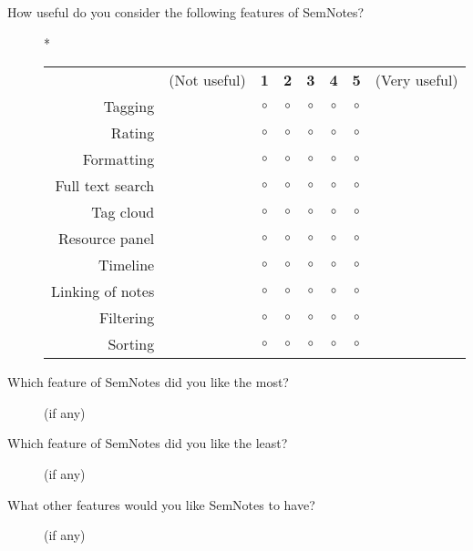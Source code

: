 \begin{description}
 \item[How useful do you consider the following features of SemNotes?] *

\begin{tabular}{rccccccc}
& (Not useful) & \textbf{1} & \textbf{2} & \textbf{3} & \textbf{4} & \textbf{5} & (Very useful) \\

Tagging && $\circ$ & $\circ$ & $\circ$ & $\circ$ & $\circ$ & \\

Rating && $\circ$ & $\circ$ & $\circ$ & $\circ$ & $\circ$ & \\

Formatting && $\circ$ & $\circ$ & $\circ$ & $\circ$ & $\circ$ & \\

Full text search && $\circ$ & $\circ$ & $\circ$ & $\circ$ & $\circ$ & \\

Tag cloud && $\circ$ & $\circ$ & $\circ$ & $\circ$ & $\circ$ & \\

Resource panel && $\circ$ & $\circ$ & $\circ$ & $\circ$ & $\circ$ &\\

Timeline && $\circ$ & $\circ$ & $\circ$ & $\circ$ & $\circ$ & \\

Linking of notes && $\circ$ & $\circ$ & $\circ$ & $\circ$ & $\circ$ & \\

Filtering && $\circ$ & $\circ$ & $\circ$ & $\circ$ & $\circ$ & \\

Sorting && $\circ$ & $\circ$ & $\circ$ & $\circ$ & $\circ$ & \\
\end{tabular} 
\end{description}

\begin{description}
 \item[Which feature of SemNotes did you like the most?] (if any)
\end{description}

\begin{description}
 \item[Which feature of SemNotes did you like the least?] (if any)
\end{description}

\begin{description}
 \item[What other features would you like SemNotes to have?] (if any)
\end{description}

